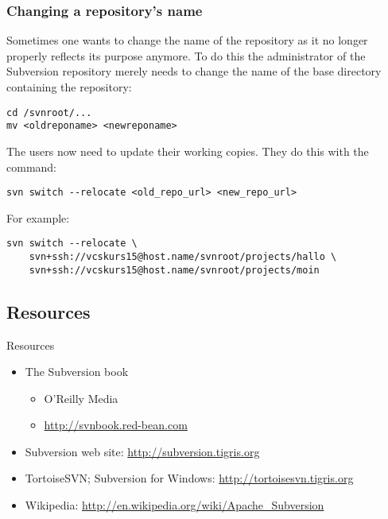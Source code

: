 \begin{frame}[fragile]
\frametitle{Changing a repository's name}

Sometimes one wants to change the name of the repository as it no longer
properly reflects its purpose anymore.  To do this the administrator of the
Subversion repository merely needs to change the name of the base directory
containing the repository:
\begin{lstlisting}
cd /svnroot/...
mv <oldreponame> <newreponame>
\end{lstlisting}

The users now need to update their working copies.  They do this with the
 command:
\begin{lstlisting}
svn switch --relocate <old_repo_url> <new_repo_url>
\end{lstlisting}

For example:
\begin{lstlisting}
svn switch --relocate \
    svn+ssh://vcskurs15@host.name/svnroot/projects/hallo \
    svn+ssh://vcskurs15@host.name/svnroot/projects/moin
\end{lstlisting}
\end{frame}

\subsection{Resources}
\begin{frame}{Resources}
    \begin{itemize}
        \item The Subversion book
            \begin{itemize}
                \item O'Reilly Media
                \item \url{http://svnbook.red-bean.com}
            \end{itemize}
        \item Subversion web site:
            \url{http://subversion.tigris.org}
        \item TortoiseSVN; Subversion for Windows:
            \url{http://tortoisesvn.tigris.org}
        \item Wikipedia:
            \url{http://en.wikipedia.org/wiki/Apache_Subversion}
    \end{itemize}
\end{frame}

